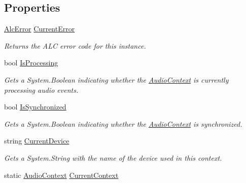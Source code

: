 \subsection*{Properties}
\begin{DoxyCompactItemize}
\item 
\hyperlink{namespace_open_t_k_1_1_audio_1_1_open_a_l_a2684b7587fe0457a0203cacbdace7bc5}{Alc\-Error} \hyperlink{class_open_t_k_1_1_audio_1_1_audio_context_a83bd17325ea568fb38e754eebd63b62f}{Current\-Error}
\begin{DoxyCompactList}\small\item\em Returns the A\-L\-C error code for this instance. \end{DoxyCompactList}\item 
bool \hyperlink{class_open_t_k_1_1_audio_1_1_audio_context_a24dfcaa456f5c1d8ce6ac0d7a1858d18}{Is\-Processing}
\begin{DoxyCompactList}\small\item\em Gets a System.\-Boolean indicating whether the \hyperlink{class_open_t_k_1_1_audio_1_1_audio_context}{Audio\-Context} is currently processing audio events. \end{DoxyCompactList}\item 
bool \hyperlink{class_open_t_k_1_1_audio_1_1_audio_context_aa1f3721b71e83da2c94d637eab4fbbcf}{Is\-Synchronized}
\begin{DoxyCompactList}\small\item\em Gets a System.\-Boolean indicating whether the \hyperlink{class_open_t_k_1_1_audio_1_1_audio_context}{Audio\-Context} is synchronized. \end{DoxyCompactList}\item 
string \hyperlink{class_open_t_k_1_1_audio_1_1_audio_context_ac7f2d8425e9afff0f9cca419792b1746}{Current\-Device}
\begin{DoxyCompactList}\small\item\em Gets a System.\-String with the name of the device used in this context. \end{DoxyCompactList}\item 
static \hyperlink{class_open_t_k_1_1_audio_1_1_audio_context}{Audio\-Context} \hyperlink{class_open_t_k_1_1_audio_1_1_audio_context_a9dcc253ceab5ef47b59029df44f45423}{Current\-Context}

\end{DoxyCompactItemize}
